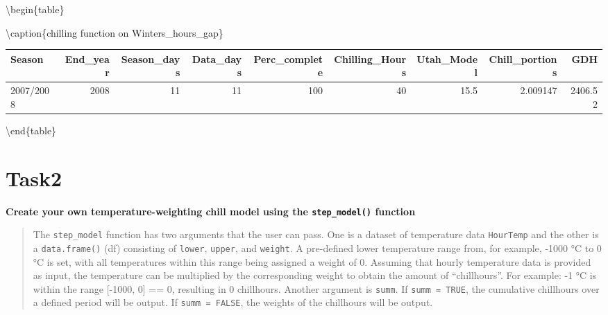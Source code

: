 \documentclass[
]{book}
\newenvironment{Shaded}{\begin{snugshade}}{\end{snugshade}}
\newcommand{\CommentTok}[1]{\textcolor[rgb]{0.56,0.35,0.01}{\textit{#1}}}
\newcommand{\DataTypeTok}[1]{\textcolor[rgb]{0.13,0.29,0.53}{#1}}
\newcommand{\DecValTok}[1]{\textcolor[rgb]{0.00,0.00,0.81}{#1}}
\newcommand{\KeywordTok}[1]{\textcolor[rgb]{0.13,0.29,0.53}{\textbf{#1}}}
\newcommand{\NormalTok}[1]{#1}
\newcommand{\OperatorTok}[1]{\textcolor[rgb]{0.81,0.36,0.00}{\textbf{#1}}}
\newcommand{\StringTok}[1]{\textcolor[rgb]{0.31,0.60,0.02}{#1}}
\begin{document}
\begin{Shaded}
\end{Shaded}

\textbackslash begin\{table\}

\textbackslash caption\{\label{tab:unnamed-chunk-9}chilling function on Winters\_hours\_gap\}
\fontsize{10}{12}\selectfont

\begin{tabular}[t]{l|r|r|r|r|r|r|r|r}
\hline
Season & End\_year & Season\_days & Data\_days & Perc\_complete & Chilling\_Hours & Utah\_Model & Chill\_portions & GDH\\
\hline
2007/2008 & 2008 & 11 & 11 & 100 & 40 & 15.5 & 2.009147 & 2406.52\\
\hline
\end{tabular}

\textbackslash end\{table\}

\hypertarget{task2}{%
\section{Task2}\label{task2}}

\textbf{Create your own temperature-weighting chill model using the \texttt{step\_model()} function}

\begin{quote}
The \texttt{step\_model} function has two arguments that the user can pass. One is a dataset of temperature data \texttt{HourTemp} and the other is a \texttt{data.frame()} (df) consisting of \texttt{lower}, \texttt{upper}, and \texttt{weight}. A pre-defined lower temperature range from, for example, -1000 °C to 0 °C is set, with all temperatures within this range being assigned a weight of 0. Assuming that hourly temperature data is provided as input, the
temperature can be multiplied by the corresponding weight to obtain the amount of ``chillhours''. For example: -1 °C is within the range {[}-1000, 0{]} == 0, resulting in 0 chillhours. Another argument is \texttt{summ}. If \texttt{summ\ =\ TRUE}, the cumulative chillhours over a defined period will be output. If \texttt{summ\ =\ FALSE}, the weights of the chillhours will be output.
\end{quote}
\end{document}
